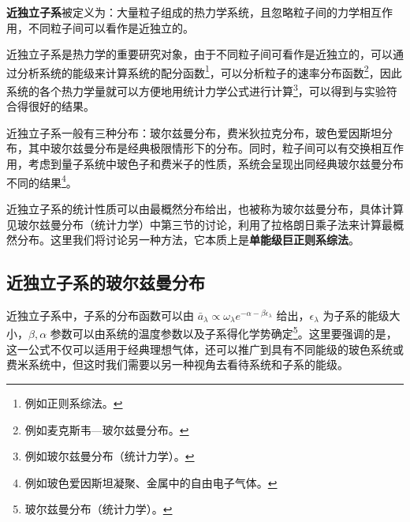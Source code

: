 

\textbf{近独立子系}被定义为：大量粒子组成的热力学系统，且忽略粒子间的力学相互作用，不同粒子间可以看作是近独立的。

近独立子系是热力学的重要研究对象，由于不同粒子间可看作是近独立的，可以通过分析系统的能级来计算系统的配分函数\footnote{例如正则系综法。}，可以分析粒子的速率分布函数\footnote{例如麦克斯韦—玻尔兹曼分布。}，因此系统的各个热力学量就可以方便地用统计力学公式进行计算\footnote{例如玻尔兹曼分布（统计力学）。}，可以得到与实验符合得很好的结果。

近独立子系一般有三种分布：玻尔兹曼分布，费米狄拉克分布，玻色爱因斯坦分布，其中玻尔兹曼分布是经典极限情形下的分布。同时，粒子间可以有交换相互作用，考虑到量子系统中玻色子和费米子的性质，系统会呈现出同经典玻尔兹曼分布不同的结果\footnote{例如玻色爱因斯坦凝聚、金属中的自由电子气体。}。

近独立子系的统计性质可以由最概然分布给出，也被称为玻尔兹曼分布，具体计算见玻尔兹曼分布（统计力学）中第三节的讨论，利用了拉格朗日乘子法来计算最概然分布。这里我们将讨论另一种方法，它本质上是\textbf{单能级巨正则系综法}。

\subsection{近独立子系的玻尔兹曼分布}
近独立子系中，子系的分布函数可以由 $\bar a_\lambda \propto \omega_\lambda e^{-\alpha-\beta\epsilon_\lambda}$ 给出，$\epsilon_\lambda$ 为子系的能级大小，$\beta,\alpha$ 参数可以由系统的温度参数以及子系得化学势确定\footnote{玻尔兹曼分布（统计力学）。}。这里要强调的是，这一公式不仅可以适用于经典理想气体，还可以推广到具有不同能级的玻色系统或费米系统中，但这时我们需要以另一种视角去看待系统和子系的能级。

